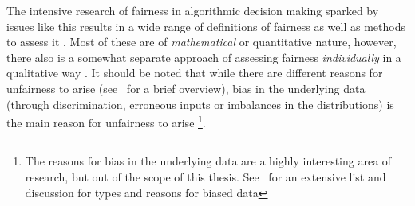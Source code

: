 The intensive research of fairness in algorithmic decision making sparked by issues like this results in a wide range of definitions of fairness as well as methods to assess it \parencite{CorbettDavies2023}.
Most of these are of \textit{mathematical} or quantitative nature, however, there also is a somewhat separate approach of assessing fairness \textit{individually} in a qualitative way \parencite{Chouldechova2018}.
It should be noted that while there are different reasons for unfairness to arise (see~\cite{Chouldechova2018} for a brief overview), bias in the underlying data (through discrimination, erroneous inputs or imbalances in the distributions) 
is the main reason for unfairness to arise \parencite{Choras2020}\footnote{The reasons for bias in the underlying data are a highly interesting area of research, but out of the scope of this thesis. See~\cite{Mehrabi2021} for an extensive list and discussion for types and reasons for biased data}.
%
